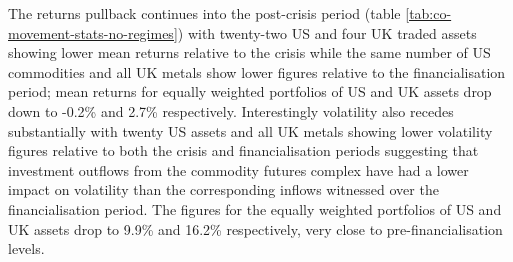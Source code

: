 \documentclass[]{elsarticle} %
\begin{document}
\medskip\setlength{\parindent}{0pt}

The returns pullback continues into the post-crisis period (table \ref{tab:co-movement-stats-no-regimes}) with twenty-two US and four UK traded assets showing lower mean returns relative to the crisis while the same number of US commodities and all UK metals show lower figures relative to the financialisation period; mean returns for equally weighted portfolios of US and UK assets drop down to -0.2\% and 2.7\% respectively. Interestingly volatility also recedes substantially with twenty US assets and all UK metals showing lower volatility figures relative to both the crisis and financialisation periods suggesting that investment outflows from the commodity futures complex have had a lower impact on volatility than the corresponding inflows witnessed over the financialisation period. The figures for the equally weighted portfolios of US and UK assets drop to 9.9\% and 16.2\% respectively, very close to pre-financialisation levels.\\
\end{document}

